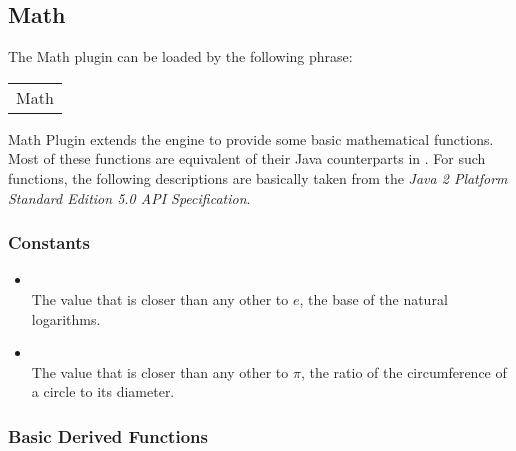 \documentclass{article}
\newcommand{\codebf}[1]{\xspace{\bf \code{#1}}\xspace}
\newcommand{\keyword}[1]{\codebf{#1}}
\newcommand{\bExample}{\begin{small} \vspace{0.3cm} \begin{tabular}{|l} \begin{minipage}{0.85\textwidth} \vspace{0.2cm} \ttfamily}
\newcommand{\eExample}{\vspace{0.2cm} \end{minipage} \end{tabular} \vspace{0.3cm} \end{small}}
\begin{document}
\begin{coreasm}

\end{coreasm}


\subsection{Math}
\label{math}

The Math plugin can be loaded by the following \keyword{use} phrase:

\bExample
	\codebf{use} Math
\eExample

\noindent Math Plugin extends the \CoreASM engine to provide some basic mathematical functions. Most of these functions are equivalent of their Java counterparts in . For such functions, the following descriptions are basically taken from the {\em Java 2 Platform Standard Edition 5.0 API Specification}. 

\subsubsection{Constants}

\begin{itemize}
\item {\bf {}} \\ The value that is closer than any other to $e$, the base of the natural logarithms.
\item {\bf {}} \\   The value that is closer than any other to $\pi$, the ratio of the circumference of a 
 circle to its diameter. 
\end{itemize}

\subsubsection{Basic Derived Functions}
\end{document}
